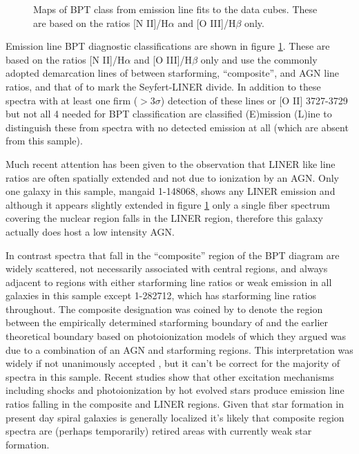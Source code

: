 \documentclass[modern]{aastex62}
\begin{document}
\begin{figure}[ht]
\caption{Maps of BPT class from emission line fits to the data cubes. These are based on the ratios [N II]/H$\alpha$ and [O III]/H$\beta$ only.}
\label{fig:bpt}
\end{figure}


Emission line BPT \citep{1981PASP...93....5B} diagnostic classifications are shown in figure \ref{fig:bpt}. These are based on the ratios [N II]/H$\alpha$ and [O III]/H$\beta$ only and use the commonly adopted demarcation lines of \citet{2003MNRAS.346.1055K} between starforming, ``composite'', and AGN line ratios, and that of \citet{2007MNRAS.382.1415S} to mark the Seyfert-LINER divide. In addition to these spectra with at least one firm ($> 3\sigma$) detection of these lines or [O II] 3727-3729 but not all 4 needed for BPT classification are classified (E)mission (L)ine to distinguish these from spectra with no detected emission at all (which are absent from this sample).

Much recent attention has been given to the observation that LINER like line ratios are often spatially extended \citep[for example][]{2016MNRAS.461.3111B, 2016MNRAS.462.1826H} and not due to ionization by an AGN. Only one galaxy in this sample, mangaid 1-148068, shows any LINER emission and although it appears slightly extended in figure \ref{fig:bpt} only a single fiber spectrum covering the nuclear region falls in the LINER region, therefore this galaxy actually does host a low intensity AGN.

In contrast spectra that fall in the ``composite'' region of the BPT diagram are widely scattered, not necessarily associated with central regions, and always adjacent to regions with either starforming line ratios or weak emission in all galaxies in this sample except 1-282712, which has starforming line ratios throughout. The composite designation was coined by \citet{2004MNRAS.351.1151B} to denote the region between the empirically determined starforming boundary of \citet{2003MNRAS.346.1055K} and the earlier theoretical boundary based on photoionization models of \citet{2001ApJ...556..121K} which they argued was due to a combination of an AGN and starforming regions. This interpretation was widely if not unanimously accepted \citep{2010MNRAS.403.1036C}, but it can't be correct for the majority of spectra in this sample. Recent studies show that other excitation mechanisms including shocks \citep{2011ApJ...734...87R, 2016ApJS..224...38A} and photoionization by hot evolved stars \citep{2008MNRAS.391L..29S} produce emission line ratios falling in the composite and LINER regions. Given that star formation in present day spiral galaxies is generally localized \citep{2012ARA&A..50..531K} it's likely that composite region spectra are (perhaps temporarily) retired areas \citep{2010MNRAS.403.1036C} with currently weak star formation.
\end{document}
